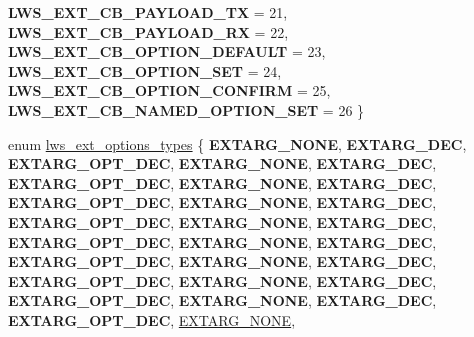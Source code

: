 \begin{DoxyCompactItemize}
{\bfseries L\+W\+S\+\_\+\+E\+X\+T\+\_\+\+C\+B\+\_\+\+P\+A\+Y\+L\+O\+A\+D\+\_\+\+TX} = 21, 
{\bfseries L\+W\+S\+\_\+\+E\+X\+T\+\_\+\+C\+B\+\_\+\+P\+A\+Y\+L\+O\+A\+D\+\_\+\+RX} = 22, 
{\bfseries L\+W\+S\+\_\+\+E\+X\+T\+\_\+\+C\+B\+\_\+\+O\+P\+T\+I\+O\+N\+\_\+\+D\+E\+F\+A\+U\+LT} = 23, 
{\bfseries L\+W\+S\+\_\+\+E\+X\+T\+\_\+\+C\+B\+\_\+\+O\+P\+T\+I\+O\+N\+\_\+\+S\+ET} = 24, 
\newline
{\bfseries L\+W\+S\+\_\+\+E\+X\+T\+\_\+\+C\+B\+\_\+\+O\+P\+T\+I\+O\+N\+\_\+\+C\+O\+N\+F\+I\+RM} = 25, 
{\bfseries L\+W\+S\+\_\+\+E\+X\+T\+\_\+\+C\+B\+\_\+\+N\+A\+M\+E\+D\+\_\+\+O\+P\+T\+I\+O\+N\+\_\+\+S\+ET} = 26
 \}
\item 
enum \hyperlink{group__extensions_gacc9f55936dc165257a2e1f7d47bce89e}{lws\+\_\+ext\+\_\+options\+\_\+types} \{ \newline
{\bfseries E\+X\+T\+A\+R\+G\+\_\+\+N\+O\+NE}, 
{\bfseries E\+X\+T\+A\+R\+G\+\_\+\+D\+EC}, 
{\bfseries E\+X\+T\+A\+R\+G\+\_\+\+O\+P\+T\+\_\+\+D\+EC}, 
{\bfseries E\+X\+T\+A\+R\+G\+\_\+\+N\+O\+NE}, 
\newline
{\bfseries E\+X\+T\+A\+R\+G\+\_\+\+D\+EC}, 
{\bfseries E\+X\+T\+A\+R\+G\+\_\+\+O\+P\+T\+\_\+\+D\+EC}, 
{\bfseries E\+X\+T\+A\+R\+G\+\_\+\+N\+O\+NE}, 
{\bfseries E\+X\+T\+A\+R\+G\+\_\+\+D\+EC}, 
\newline
{\bfseries E\+X\+T\+A\+R\+G\+\_\+\+O\+P\+T\+\_\+\+D\+EC}, 
{\bfseries E\+X\+T\+A\+R\+G\+\_\+\+N\+O\+NE}, 
{\bfseries E\+X\+T\+A\+R\+G\+\_\+\+D\+EC}, 
{\bfseries E\+X\+T\+A\+R\+G\+\_\+\+O\+P\+T\+\_\+\+D\+EC}, 
\newline
{\bfseries E\+X\+T\+A\+R\+G\+\_\+\+N\+O\+NE}, 
{\bfseries E\+X\+T\+A\+R\+G\+\_\+\+D\+EC}, 
{\bfseries E\+X\+T\+A\+R\+G\+\_\+\+O\+P\+T\+\_\+\+D\+EC}, 
{\bfseries E\+X\+T\+A\+R\+G\+\_\+\+N\+O\+NE}, 
\newline
{\bfseries E\+X\+T\+A\+R\+G\+\_\+\+D\+EC}, 
{\bfseries E\+X\+T\+A\+R\+G\+\_\+\+O\+P\+T\+\_\+\+D\+EC}, 
{\bfseries E\+X\+T\+A\+R\+G\+\_\+\+N\+O\+NE}, 
{\bfseries E\+X\+T\+A\+R\+G\+\_\+\+D\+EC}, 
\newline
{\bfseries E\+X\+T\+A\+R\+G\+\_\+\+O\+P\+T\+\_\+\+D\+EC}, 
{\bfseries E\+X\+T\+A\+R\+G\+\_\+\+N\+O\+NE}, 
{\bfseries E\+X\+T\+A\+R\+G\+\_\+\+D\+EC}, 
{\bfseries E\+X\+T\+A\+R\+G\+\_\+\+O\+P\+T\+\_\+\+D\+EC}, 
\newline
{\bfseries E\+X\+T\+A\+R\+G\+\_\+\+N\+O\+NE}, 
{\bfseries E\+X\+T\+A\+R\+G\+\_\+\+D\+EC}, 
{\bfseries E\+X\+T\+A\+R\+G\+\_\+\+O\+P\+T\+\_\+\+D\+EC}, 
\hyperlink{group__extensions_ggacc9f55936dc165257a2e1f7d47bce89eaabcf56c456c1ff6e81dc82586a16f14c}{E\+X\+T\+A\+R\+G\+\_\+\+N\+O\+NE}, 

\end{DoxyCompactItemize}
